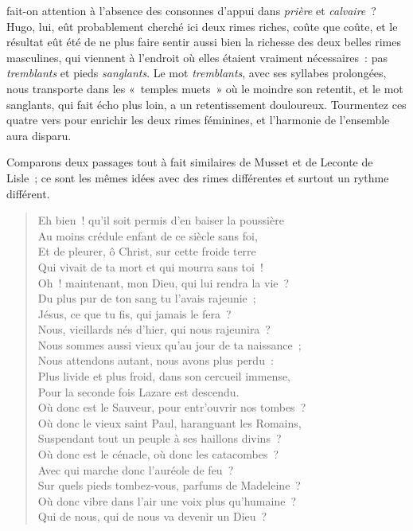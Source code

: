 \documentclass[french,twoside]{book} %
\begin{document}
\noindent fait-on attention à l’absence des consonnes d’appui dans \emph{prière} et \emph{calvaire} ? Hugo, lui, eût probablement cherché ici deux rimes riches, coûte que coûte, et le résultat eût été de ne plus faire sentir aussi bien la richesse des deux belles rimes masculines, qui viennent à l’endroit où elles étaient vraiment nécessaires : pas \emph{tremblants} et pieds \emph{sanglants}. Le mot \emph{tremblants}, avec ses syllabes prolongées, nous transporte dans les « temples muets » où le moindre son retentit, et le mot sanglants, qui fait écho plus loin, a un retentissement douloureux. Tourmentez ces quatre vers pour enrichir les deux rimes féminines, et l’harmonie de l’ensemble aura disparu.\par
Comparons deux passages tout à fait similaires de Musset et de Leconte de Lisle ; ce sont les mêmes idées avec des rimes différentes et surtout un rythme différent.\par


\begin{verse}
Eh bien ! qu’il soit permis d’en baiser la poussière\\
Au moins crédule enfant de ce siècle sans foi,\\
Et de pleurer, ô Christ, sur cette froide terre\\
Qui vivait de ta mort et qui mourra sans toi !\\
Oh ! maintenant, mon Dieu, qui lui rendra la vie ?\\
Du plus pur de ton sang tu l’avais rajeunie ;\\
Jésus, ce que tu fis, qui jamais le fera ?\\
Nous, vieillards nés d’hier, qui nous rajeunira ?\\
Nous sommes aussi vieux qu’au jour de ta naissance ;\\
Nous attendons autant, nous avons plus perdu :\\
Plus livide et plus froid, dans son cercueil immense,\\
Pour la seconde fois Lazare est descendu.\\
Où donc est le Sauveur, pour entr’ouvrir nos tombes ?\\
Où donc le vieux saint Paul, haranguant les Romains,\\
Suspendant tout un peuple à ses haillons divins ?\\
Où donc est le cénacle, où donc les catacombes ?\\
Avec qui marche donc l’auréole de feu ?\\
Sur quels pieds tombez-vous, parfums de Madeleine ?\\
Où donc vibre dans l’air une voix plus qu’humaine ?\\
Qui de nous, qui de nous va devenir un Dieu ?\\
\end{verse}
\end{document}
